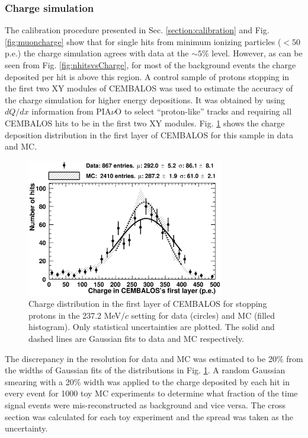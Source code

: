 \subsubsection{\bf Charge simulation}
The calibration procedure presented in Sec. \ref{section:calibration} and Fig. \ref{fig:muoncharge} show that for single hits from minimum ionizing particles ($<50$ p.e.) the charge simulation agrees with data at the $\sim5$\% level. However, as can be seen from Fig. \ref{fig:nhitsvsCharge}, for most of the background events the charge deposited per hit is above this region. A control sample of protons stopping in the first two XY modules of CEMBALOS was used to estimate the accuracy of the charge simulation for higher energy depositions. It was obtained by using $dQ/dx$ information from PIA$\nu$O to select ``proton-like'' tracks and requiring all CEMBALOS hits to be in the first two XY modules. Fig. \ref{fig:proton_sample} shows the charge deposition distribution in the first layer of CEMBALOS for this sample in data and MC.
\begin{figure}[ht]
 \includegraphics[width=86mm]{figures/proton_contained_1stlayer.eps}
 \caption{Charge distribution in the first layer of CEMBALOS for stopping protons in the 237.2 MeV$/c$ setting for data (circles) and MC (filled histogram). Only statistical uncertainties are plotted. The solid and dashed lines are Gaussian fits to data and MC respectively.}
 \label{fig:proton_sample}
\end{figure}

The discrepancy in the resolution for data and MC was estimated to be 20\% from the widths of Gaussian fits of the distributions in Fig. \ref{fig:proton_sample}.
A random Gaussian smearing with a 20\% width was applied to the charge deposited by each hit in every event for 1000 toy MC experiments to determine what fraction of the time signal events were mis-reconstructed as background and vice versa. The cross section was calculated for each toy experiment and the spread was taken as the uncertainty.

